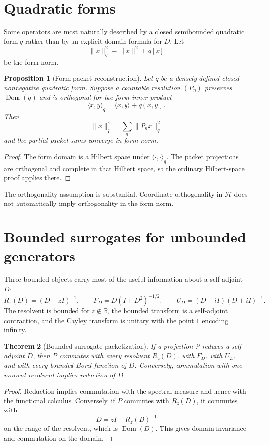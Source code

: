 \documentclass[11pt]{article}
\newtheorem{theorem}{Theorem}[section]
\newtheorem{proposition}[theorem]{Proposition}
\theoremstyle{definition}
\theoremstyle{remark}
\begin{document}
\section{Quadratic forms}

Some operators are most naturally described by a closed semibounded quadratic form $q$ rather than by an explicit domain formula for $D$.  Let
\[
\|x\|_q^2=\|x\|^2+q[x]
\]
be the form norm.

\begin{proposition}[Form-packet reconstruction]
Let $q$ be a densely defined closed nonnegative quadratic form.  Suppose a countable resolution $(P_n)$ preserves $\operatorname{Dom}(q)$ and is orthogonal for the form inner product
\[
\langle x,y\rangle_q
=
\langle x,y\rangle+q(x,y).
\]
Then
\[
\|x\|_q^2=\sum_n\|P_nx\|_q^2
\]
and the partial packet sums converge in form norm.
\end{proposition}

\begin{proof}
The form domain is a Hilbert space under $\langle\cdot,\cdot\rangle_q$.  The packet projections are orthogonal and complete in that Hilbert space, so the ordinary Hilbert-space proof applies there.
\end{proof}

The orthogonality assumption is substantial.  Coordinate orthogonality in $\mathcal H$ does not automatically imply orthogonality in the form norm.

\section{Bounded surrogates for unbounded generators}

Three bounded objects carry most of the useful information about a self-adjoint $D$:
\[
R_z(D)=(D-zI)^{-1},
\qquad
F_D=D(I+D^2)^{-1/2},
\qquad
U_D=(D-iI)(D+iI)^{-1}.
\]
The resolvent is bounded for $z\notin\mathbb R$, the bounded transform is a self-adjoint contraction, and the Cayley transform is unitary with the point $1$ encoding infinity.

\begin{theorem}[Bounded-surrogate packetization]
If a projection $P$ reduces a self-adjoint $D$, then $P$ commutes with every resolvent $R_z(D)$, with $F_D$, with $U_D$, and with every bounded Borel function of $D$.  Conversely, commutation with one nonreal resolvent implies reduction of $D$.
\end{theorem}

\begin{proof}
Reduction implies commutation with the spectral measure and hence with the functional calculus.  Conversely, if $P$ commutes with $R_z(D)$, it commutes with
\[
D=zI+R_z(D)^{-1}
\]
on the range of the resolvent, which is $\operatorname{Dom}(D)$.  This gives domain invariance and commutation on the domain.
\end{proof}
\end{document}
